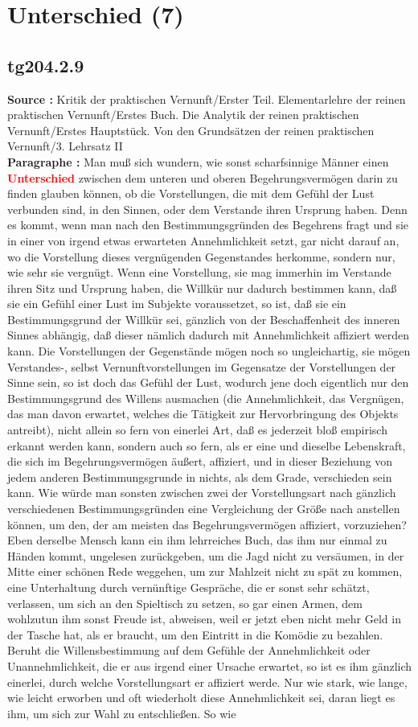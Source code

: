 \documentclass[a4paper,12pt,twoside]{book}
\newcommand{\match}[1]{\textcolor{red}{\textbf{#1}}}
\newcommand{\unnumberedsection}[1]{
	\section*{#1}
	\addcontentsline{toc}{section}{#1}
	\markright{#1}
}
\begin{document}
	\unnumberedsection{Unterschied (7)} 
	\subsection*{tg204.2.9} 
	\textbf{Source : }Kritik der praktischen Vernunft/Erster Teil. Elementarlehre der reinen praktischen Vernunft/Erstes Buch. Die Analytik der reinen praktischen Vernunft/Erstes Hauptstück. Von den Grundsätzen der reinen praktischen Vernunft/3. Lehrsatz II\\  
	
	\noindent\textbf{Paragraphe : }Man muß sich wundern, wie sonst scharfsinnige Männer einen \match{Unterschied} zwischen dem unteren und oberen Begehrungsvermögen darin zu finden glauben können, ob die Vorstellungen, die mit dem Gefühl der Lust verbunden sind, in den Sinnen, oder dem Verstande ihren Ursprung haben. Denn es kommt, wenn man nach den Bestimmungsgründen des Begehrens fragt und sie in einer von irgend etwas erwarteten Annehmlichkeit setzt, gar nicht darauf an, wo die Vorstellung dieses vergnügenden Gegenstandes herkomme, sondern nur, wie sehr sie vergnügt. Wenn eine Vorstellung, sie mag immerhin im Verstande ihren Sitz und Ursprung haben, die Willkür nur dadurch bestimmen  kann, daß sie ein Gefühl einer Lust im Subjekte voraussetzet, so ist, daß sie ein Bestimmungsgrund der Willkür sei, gänzlich von der Beschaffenheit des inneren Sinnes abhängig, daß dieser nämlich dadurch mit Annehmlichkeit affiziert werden kann. Die Vorstellungen der Gegenstände mögen noch so ungleichartig, sie mögen Verstandes-, selbst Vernunftvorstellungen im Gegensatze der Vorstellungen der Sinne sein, so ist doch das Gefühl der Lust, wodurch jene doch eigentlich nur den Bestimmungsgrund des Willens ausmachen (die Annehmlichkeit, das Vergnügen, das man davon erwartet, welches die Tätigkeit zur Hervorbringung des Objekts antreibt), nicht allein so fern von einerlei Art, daß es jederzeit bloß empirisch erkannt werden kann, sondern auch so fern, als er eine und dieselbe Lebenskraft, die sich im Begehrungsvermögen äußert, affiziert, und in dieser Beziehung von jedem anderen Bestimmungsgrunde in nichts, als dem Grade, verschieden sein kann. Wie würde man sonsten zwischen zwei der Vorstellungsart nach gänzlich verschiedenen Bestimmungsgründen eine Vergleichung der Größe nach anstellen können, um den, der am meisten das Begehrungsvermögen affiziert, vorzuziehen? Eben derselbe Mensch kann ein ihm lehrreiches Buch, das ihm nur einmal zu Händen kommt, ungelesen zurückgeben, um die Jagd nicht zu versäumen, in der Mitte einer schönen Rede weggehen, um zur Mahlzeit nicht zu spät zu kommen, eine Unterhaltung durch vernünftige Gespräche, die er sonst sehr schätzt, verlassen, um sich an den Spieltisch zu setzen, so gar einen Armen, dem wohlzutun ihm sonst Freude ist, abweisen, weil er jetzt eben nicht mehr Geld in der Tasche hat, als er braucht, um den Eintritt in die Komödie zu bezahlen. Beruht die Willensbestimmung auf dem Gefühle der Annehmlichkeit oder Unannehmlichkeit, die er aus irgend einer Ursache erwartet, so ist es ihm gänzlich einerlei, durch welche Vorstellungsart er affiziert werde. Nur wie stark, wie lange, wie leicht erworben und oft wiederholt diese Annehmlichkeit sei, daran liegt es ihm, um sich zur Wahl zu entschließen. So wie 
\end{document}
